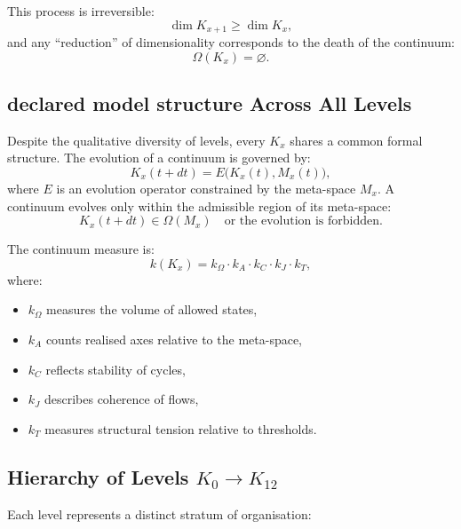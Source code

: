 This process is irreversible:
\[
\dim K_{x+1} \ge \dim K_x,
\]
and any ``reduction'' of dimensionality corresponds to the death of the
continuum:
\[
\Omega(K_x) = \varnothing.
\]


\subsection{declared model structure Across All Levels}

Despite the qualitative diversity of levels, every $K_x$ shares a common
formal structure.  
The evolution of a continuum is governed by:
\[
K_x(t + dt) = E\bigl(K_x(t), M_x(t)\bigr),
\]
where $E$ is an evolution operator constrained by the meta-space
$M_x$.  
A continuum evolves only within the admissible region of its
meta-space:
\[
K_x(t+dt) \in \Omega(M_x)
\quad\text{or the evolution is forbidden}.
\]

The continuum measure is:
\[
k(K_x) =
k_{\Omega} \cdot k_{A} \cdot k_{C} \cdot k_{J} \cdot k_{T},
\]
where:
\begin{itemize}
    \item $k_{\Omega}$ measures the volume of allowed states,
    \item $k_{A}$ counts realised axes relative to the meta-space,
    \item $k_{C}$ reflects stability of cycles,
    \item $k_{J}$ describes coherence of flows,
    \item $k_{T}$ measures structural tension relative to thresholds.
\end{itemize}


\subsection{Hierarchy of Levels $K_0 \to K_{12}$}

Each level represents a distinct stratum of organisation:

